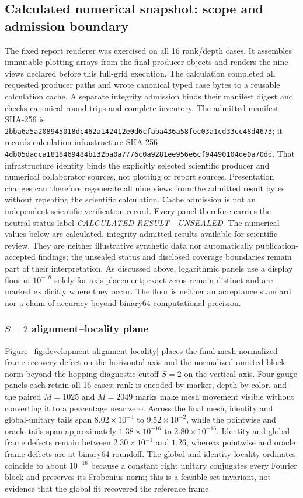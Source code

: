 \documentclass[11pt]{article}
\begin{document}
\subsection{Calculated numerical snapshot: scope and admission boundary}
\label{sec:development-snapshot}

The fixed report renderer was exercised on all 16 rank/depth cases. It assembles
immutable plotting arrays from the final producer objects and renders the nine views
declared before this full-grid execution. The calculation completed all requested
producer paths and wrote canonical typed case
bytes to a reusable calculation cache. A separate integrity admission binds their
manifest digest and checks canonical round trips and complete inventory. The admitted
manifest SHA-256 is
\nolinkurl{2bba6a5a208945018dc462a142412e0d6cfaba436a58fec03a1cd33cc48d4673};
it records calculation-infrastructure SHA-256
\nolinkurl{4db05dadca1818469484b132ba0a7776c0a9281ee956e6cf94490104de0a70dd}.
That infrastructure identity binds the explicitly selected scientific producer and
numerical collaborator sources, not plotting or report sources. Presentation changes can
therefore regenerate all nine views from the admitted result bytes without repeating the
scientific calculation. Cache admission is not an independent scientific verification
record. Every panel therefore carries the neutral status label
\emph{CALCULATED RESULT---UNSEALED}. The numerical values below are calculated,
integrity-admitted results available for scientific review. They are neither illustrative
synthetic data nor automatically publication-accepted findings; the unsealed status and
disclosed coverage boundaries remain part of their interpretation. As discussed above,
logarithmic panels use a display floor of $10^{-18}$ solely for axis placement; exact
zeros remain distinct and are marked explicitly where they occur. The floor is neither
an acceptance standard nor a claim of accuracy beyond binary64 computational precision.

\subsubsection{$S=2$ alignment--locality plane}

Figure~\ref{fig:development-alignment-locality} places the final-mesh normalized
frame-recovery defect on the horizontal axis and the normalized omitted-block norm
beyond the hopping-diagnostic cutoff $S=2$ on the vertical axis. Four gauge panels each
retain all 16 cases;
rank is encoded by marker, depth by color, and the paired $M=1025$ and $M=2049$ marks
make mesh movement visible without converting it to a percentage near zero. Across the final
mesh, identity and global-unitary tails span $8.02\times10^{-4}$ to
$9.52\times10^{-2}$, while the pointwise and oracle tails span approximately
$1.38\times10^{-16}$ to $2.80\times10^{-16}$. Identity and global frame defects remain
between $2.30\times10^{-1}$ and $1.26$, whereas pointwise and oracle frame defects are at
binary64 roundoff. The global and identity locality ordinates coincide to about
$10^{-16}$ because a constant right unitary conjugates every Fourier block and preserves
its Frobenius norm; this is a feasible-set invariant, not evidence that the global fit
recovered the reference frame.
\end{document}
